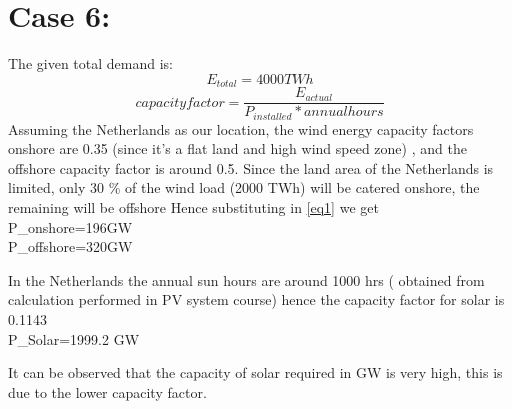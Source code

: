
\section{\textbf{Case 6:}}
The given total demand is:
\begin{equation}
    E_{total}=4000TWh
    \end {equation}
\begin{equation}
    capacity factor=\frac{E_{actual}}{P_{installed}*annual hours}
\end{equation}\label{eq1}
Assuming the Netherlands as our location, the wind energy capacity factors onshore are 0.35 (since it's a flat land and high wind speed zone) , and the offshore capacity factor is around 0.5.
Since the land area of the Netherlands is limited, only 30 \% of the wind load (2000 TWh) will be catered onshore, the remaining will be offshore
Hence substituting in \eqref{eq1} we get \\
P_{onshore}=196GW\\
P_{offshore}=320GW

In the Netherlands the annual sun hours are around 1000 hrs ( obtained from calculation performed in PV system course) hence the capacity factor for solar is 0.1143\\
P_{Solar}=1999.2 GW

It can be observed that the capacity of solar required in GW is very high, this is due to the lower capacity factor.

